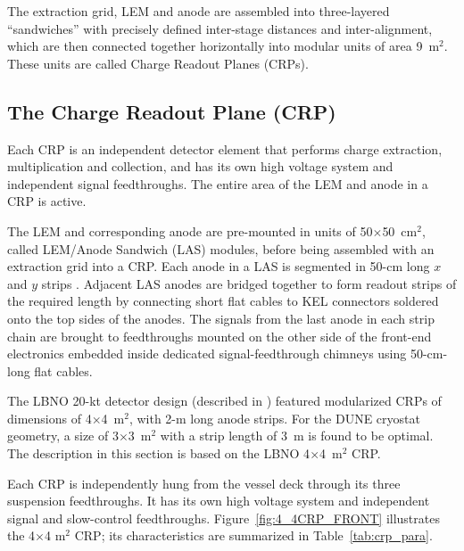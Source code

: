 The extraction grid, LEM and anode are assembled into three-layered ``sandwiches'' with precisely defined inter-stage distances and inter-alignment,  which are then connected together horizontally into
modular units of area \num{9}~m$^2$. These units are called Charge Readout Planes (CRPs).


\subsection{The Charge Readout Plane (CRP)}

Each CRP is an independent detector element that performs charge
extraction, multiplication and collection, and has its own high
voltage system and independent signal feedthroughs. The entire area of
the LEM and anode in a CRP is active.

The LEM and corresponding anode are pre-mounted in units of 50$\times$50~cm$^2$, called
LEM/Anode Sandwich (LAS) modules, before being assembled with an extraction
grid into a CRP. Each
anode in a LAS is segmented in 50-cm long $x$ and $y$ strips . Adjacent LAS anodes
are bridged together to form readout strips of the required length by
connecting short flat cables to KEL connectors soldered onto the top
sides of the anodes. The signals from the last anode in each 
strip chain are brought to feedthroughs
mounted on the other side of the front-end electronics embedded inside
dedicated signal-feedthrough chimneys using 50-cm-long flat cables.

The LBNO 20-kt detector design (described in \anxlbnob) featured
modularized CRPs of dimensions of 4$\times$4~m$^2$, with 2-m long
anode strips. For the DUNE cryostat geometry, a size of 3$\times$3~m$^2$
with a strip length of 3~m is found to be optimal. The description in
this section is based on the LBNO 4$\times$4~m$^2$ CRP.

Each CRP is independently hung from the vessel deck through its three
suspension feedthroughs. It has its own high voltage system and 
independent signal and slow-control feedthroughs.
Figure~\ref{fig:4_4CRP_FRONT} illustrates the 4$\times$4 m$^2$ CRP;
its characteristics are summarized in Table~\ref{tab:crp_para}.


